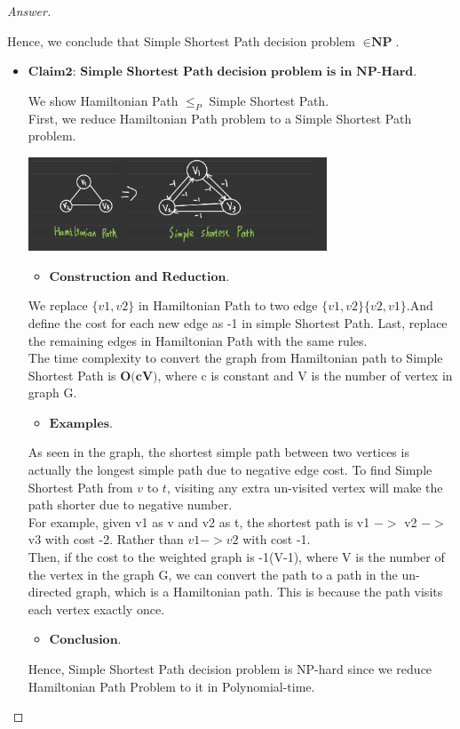 \documentclass[11pt]{article}
\theoremstyle{definition}
\theoremstyle{definition}
\theoremstyle{definition}
\begin{document}
\begin{proof}[Answer]
\begin{itemize}
 Hence, we conclude that Simple Shortest Path decision problem $\in \textbf{NP}$.
\end{itemize}
\begin{itemize}
\item$\textbf{Claim2: Simple Shortest Path decision problem is in NP-Hard}$.

We show Hamiltonian Path $\leq_P$ Simple Shortest Path.\\
First, we reduce Hamiltonian Path problem to a Simple Shortest Path problem.
\begin{center}
\includegraphics[width=0.7\textwidth]{IMG_0518.PNG}
\end{center}
\begin{itemize}
\item$\textbf{Construction and Reduction}$.
\end{itemize}
We replace $\{v1,v2\}$ in Hamiltonian Path to two edge $\{v1,v2\}\{v2,v1\}. $And define the cost for each new edge as -1 in simple Shortest Path. Last, replace the remaining edges in Hamiltonian Path with the same rules.\\
 The time complexity to convert the graph from Hamiltonian path to Simple Shortest Path is $\textbf{O(cV)}$, where c is constant and V is the number of vertex in graph G. 
\begin{itemize}
\item$\textbf{Examples}$.
\end{itemize}
As seen in the graph, the shortest simple path between two vertices is actually the longest simple path due to negative edge cost. 
To find Simple Shortest Path from $v$ to $t$, visiting any extra un-visited vertex will make the path shorter due to negative number. \\
For example, given v1 as v and v2 as t, the shortest path is v1 $->$ v2 $->$ v3 with cost -2. Rather than $v1->v2$ with cost -1.\\
Then, if the cost to the weighted graph is -1(V-1), where V is the number of the vertex in the graph G, we can convert the path to a path in the un-directed graph, which is a Hamiltonian path. This is because the path visits each vertex exactly once.
\begin{itemize}
\item$\textbf{Conclusion}$.
\end{itemize}
Hence, Simple Shortest Path decision problem is NP-hard since we reduce Hamiltonian Path Problem to it in Polynomial-time.
\end{itemize}
\end{proof}
\end{document}
